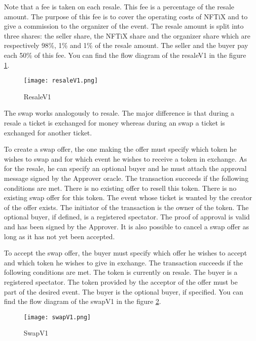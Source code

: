 \documentclass[a4paper,11pt,oneside]{report}
\begin{document}
Note that a fee is taken on each resale. This fee is a percentage of the resale amount. The purpose of this fee is to cover the operating costs of NFTiX and to give a commission to the organizer of the event. The resale amount is split into three shares: the seller share, the NFTiX share and the organizer share which are respectively 98\%, 1\% and 1\% of the resale amount. The seller and the buyer pay each 50\% of this fee. You can find the flow diagram of the resaleV1 in the figure \hyperref[fig:resaleV1]{\ref{fig:resaleV1}}.

\begin{figure}[h!]
  \texttt{[image: resaleV1.png]}
  \caption{ResaleV1}
  \label{fig:resaleV1}
\end{figure}

The swap works analogously to resale. The major difference is that during a resale a ticket is exchanged for money whereas during an swap a ticket is exchanged for another ticket.

To create a swap offer, the one making the offer must specify which token he wishes to swap and for which event he wishes to receive a token in exchange. As for the resale, he can specify an optional buyer and he must attach the approval message signed by the Approver oracle. The transaction succeeds if the following conditions are met. There is no existing offer to resell this token. There is no existing swap offer for this token. The event whose ticket is wanted by the creator of the offer exists. The initiator of the transaction is the owner of the token. The optional buyer, if defined, is a registered spectator. The proof of approval is valid and has been signed by the Approver. It is also possible to cancel a swap offer as long as it has not yet been accepted.

To accept the swap offer, the buyer must specify which offer he wishes to accept and which token he wishes to give in exchange. The transaction succeeds if the following conditions are met. The token is currently on resale. The buyer is a registered spectator. The token provided by the acceptor of the offer must be part of the desired event. The buyer is the optional buyer, if specified. You can find the flow diagram of the swapV1 in the figure \hyperref[fig:swapV1]{\ref{fig:swapV1}}.

\begin{figure}[h!]
  \texttt{[image: swapV1.png]}
  \caption{SwapV1}
  \label{fig:swapV1}
\end{figure}
\end{document}
